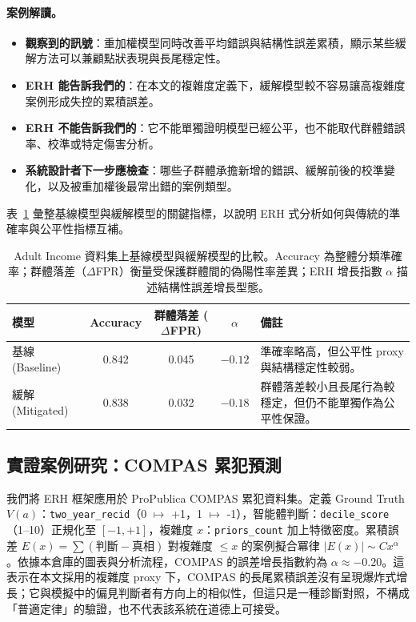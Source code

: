 \documentclass[12pt,a4paper]{article}
\theoremstyle{definition}
\theoremstyle{remark}
\begin{document}
\paragraph{案例解讀。}
\begin{itemize}
    \item \textbf{觀察到的訊號}：重加權模型同時改善平均錯誤與結構性誤差累積，顯示某些緩解方法可以兼顧點狀表現與長尾穩定性。
    \item \textbf{ERH 能告訴我們的}：在本文的複雜度定義下，緩解模型較不容易讓高複雜度案例形成失控的累積誤差。
    \item \textbf{ERH 不能告訴我們的}：它不能單獨證明模型已經公平，也不能取代群體錯誤率、校準或特定傷害分析。
    \item \textbf{系統設計者下一步應檢查}：哪些子群體承擔新增的錯誤、緩解前後的校準變化，以及被重加權後最常出錯的案例類型。
\end{itemize}

表~\ref{tab:real_data_comparison_zh} 彙整基線模型與緩解模型的關鍵指標，以說明 ERH 式分析如何與傳統的準確率與公平性指標互補。

\begin{table}[htbp]
\centering
\small
\caption{Adult Income 資料集上基線模型與緩解模型的比較。Accuracy 為整體分類準確率；群體落差（$\Delta$FPR）衡量受保護群體間的偽陽性率差異；ERH 增長指數 $\alpha$ 描述結構性誤差增長型態。}
\label{tab:real_data_comparison_zh}
\begin{tabularx}{\textwidth}{l c c c >{\raggedright\arraybackslash}X}
\toprule
\textbf{模型} & \textbf{Accuracy} & \textbf{群體落差 ($\Delta$FPR)} & \textbf{$\alpha$} & \textbf{備註} \\
\midrule
基線 (Baseline)  & 0.842 & 0.045 & $-0.12$ & 準確率略高，但公平性 proxy 與結構穩定性較弱。 \\
緩解 (Mitigated) & 0.838 & 0.032 & $-0.18$ & 群體落差較小且長尾行為較穩定，但仍不能單獨作為公平性保證。 \\
\bottomrule
\end{tabularx}
\normalsize
\end{table}

\subsection{實證案例研究：COMPAS 累犯預測}
\label{subsec:compas_zh}

我們將 ERH 框架應用於 ProPublica COMPAS 累犯資料集。定義 Ground Truth $V(a)$：\texttt{two\_year\_recid}（0 $\mapsto$ +1，1 $\mapsto$ -1），智能體判斷：\texttt{decile\_score}（1--10）正規化至 $[-1,+1]$，複雜度 $x$：\texttt{priors\_count} 加上特徵密度。累積誤差 $E(x) = \sum (\text{判斷} - \text{真相})$ 對複雜度 $\leq x$ 的案例擬合冪律 $|E(x)| \sim C x^\alpha$。依據本倉庫的圖表與分析流程，COMPAS 的誤差增長指數約為 $\alpha \approx -0.20$。這表示在本文採用的複雜度 proxy 下，COMPAS 的長尾累積誤差沒有呈現爆炸式增長；它與模擬中的偏見判斷者有方向上的相似性，但這只是一種診斷對照，不構成「普適定律」的驗證，也不代表該系統在道德上可接受。
\end{document}
